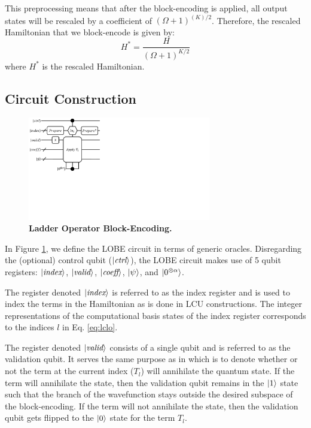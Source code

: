 This preprocessing means that after the block-encoding is applied, all output states will be rescaled by a coefficient of $(\Omega + 1)^{(K)/2}$.
Therefore, the rescaled Hamiltonian that we block-encode is given by:
\begin{equation}
    H^* = \frac{H}{(\Omega + 1)^{K/2}}
\end{equation}
where $H^*$ is the rescaled Hamiltonian.

\subsection{Circuit Construction}
\label{subsec:circuit}

\begin{figure}
    \centering
    \includegraphics[width=8cm]{figures/lobe-block-encoding.pdf}
    \caption{\textbf{Ladder Operator Block-Encoding.}
    }
    \label{fig:lobe}
\end{figure}

In Figure \ref{fig:lobe}, we define the LOBE circuit in terms of generic oracles.
Disregarding the (optional) control qubit ($\ket{\textit{ctrl}}$), the LOBE circuit makes use of 5 qubit registers: $\ket{\textit{index}}$, $\ket{\textit{valid}}$, $\ket{\textit{coeff}}$, $\ket{\psi}$, and $\ket{0^{\otimes \alpha}}$.

The register denoted $\ket{\textit{index}}$ is referred to as the index register and is used to index the terms in the Hamiltonian as is done in LCU constructions. 
The integer representations of the computational basis states of the index register corresponds to the indices $l$ in Eq. \ref{eq:lclo}. 

The register denoted $\ket{\textit{valid}}$ consists of a single qubit and is referred to as the validation qubit.
It serves the same purpose as in \cite{liu2024efficient} which is to denote whether or not the term at the current index ($T_l$) will annihilate the quantum state.
If the term will annihilate the state, then the validation qubit remains in the $\ket{1}$ state such that the branch of the wavefunction stays outside the desired subspace of the block-encoding.
If the term will not annihilate the state, then the validation qubit gets flipped to the $\ket{0}$ state for the term $T_l$.

